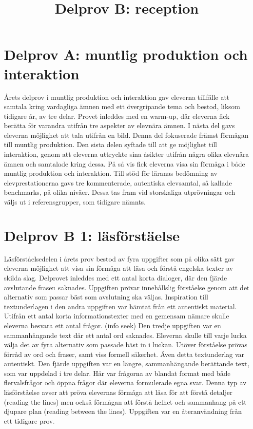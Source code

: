 \section*{Delprov A: muntlig produktion och interaktion}
Årets delprov i muntlig produktion och interaktion gav eleverna tillfälle att samtala kring vardagliga ämnen med ett övergripande tema och bestod, liksom tidigare år, av tre delar. Provet inleddes med en warm-up, där eleverna fick berätta för varandra utifrån tre aspekter av elevnära ämnen. I nästa del gavs eleverna möjlighet att tala utifrån en bild. Denna del fokuserade främst förmågan till muntlig produktion. Den sista delen syftade till att ge möjlighet till interaktion, genom att eleverna uttryckte sina åsikter utifrån några olika elevnära ämnen och samtalade kring dessa. På så vis fick eleverna visa sin förmåga i både muntlig produktion och interaktion.
Till stöd för läranas bedömning av elevprestationerna gavs tre kommenterade, autentiska elevsamtal, så kallade benchmarks, på olika niväer. Dessa tas fram vid storskaliga utprövningar och väljs ut i referensgrupper, som tidigare nämnts.

\title{
Delprov B: reception
}
\section*{Delprov B 1: läsförstäelse}
Läsförståelsedelen i årets prov bestod av fyra uppgifter som på olika sätt gav eleverna möjlighet att visa sin förmåga att läsa och förstå engelska texter av skilda slag. Delprovet inleddes med ett antal korta dialoger, där den fjärde avslutande frasen saknades. Uppgiften prövar innehållslig förståelse genom att det alternativ som passar bäst som avslutning ska väljas.
Inspiration till textunderlagen i den andra uppgiften var hämtat från ett autentiskt material. Utifrån ett antal korta informationstexter med en gemensam nämare skulle eleverna besvara ett antal frågor. (info seek)
Den tredje uppgiften var en sammanhängande text där ett antal ord saknades. Eleverna skulle till varje lucka välja det av fyra alternativ som passade bäst in i luckan. Utöver förståelse prövas förråd av ord och fraser, samt viss formell säkerhet. Även detta textunderlag var autentiskt.
Den fjärde uppgiften var en längre, sammanhängande berättande text, som var uppdelad i tre delar. Här var frågorna av blandat format med både flervalsfrågor och öppna frågor där eleverna formulerade egna svar. Denna typ av läsförståelse avser att pröva elevernas förmåga att läsa för att förstå detaljer (reading the lines) men också förmågan att förstå helhet och sammanhang på ett djupare plan (reading between the lines). Uppgiften var en återanvändning från ett tidigare prov.
